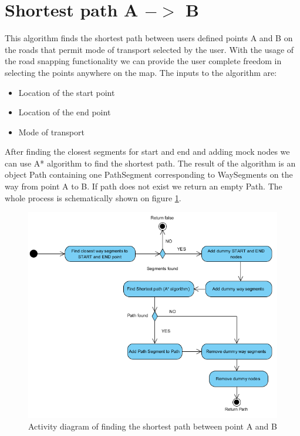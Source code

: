 \section{Shortest path A $->$ B}
This algorithm finds the shortest path between users defined points A and B on the roads that permit mode of transport selected by the user. With the usage of the road snapping functionality we can provide the user complete freedom in selecting the points anywhere on the map. The inputs to the algorithm are:
\begin{itemize}
\item Location of the start point
\item Location of the end point
\item Mode of transport
\end{itemize}
After finding the closest segments for start and end and adding mock nodes we can use A* algorithm to find the shortest path. The result of the algorithm is an object Path containing one PathSegment corresponding to WaySegments on the way from point A to B. If path does not exist we return an empty Path. The whole process is schematically shown on figure \ref{fig:ab_activity}.
\begin{figure}[h]
\centering
\includegraphics[width=0.8\linewidth]{../pictures/shortest_path_ab_activity.png}
\caption{Activity diagram of finding the shortest path between point A and B}
\label{fig:ab_activity}
\end{figure}

